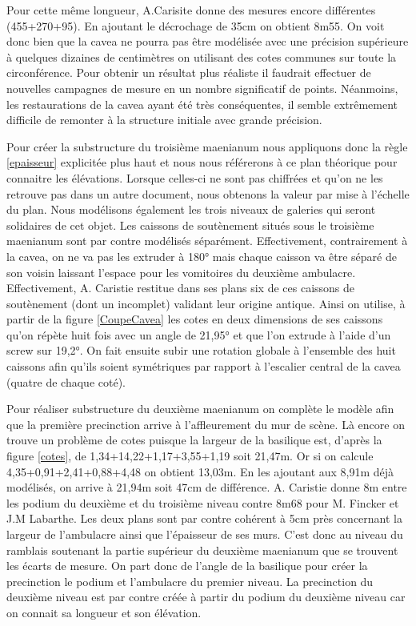 Pour cette même longueur, A.Carisite donne des mesures encore différentes (455+270+95). En ajoutant le décrochage de 35cm on obtient 8m55. On voit donc bien que la cavea ne pourra pas être modélisée avec une précision supérieure à quelques dizaines de centimètres on utilisant des cotes communes sur toute la circonférence. Pour obtenir un résultat plus réaliste il faudrait effectuer de nouvelles campagnes de mesure en un nombre significatif de points. Néanmoins, les restaurations de la cavea ayant été très conséquentes, il semble extrêmement difficile de remonter à la structure initiale avec grande précision.

Pour créer la substructure du troisième maenianum nous appliquons donc la règle \ref{epaisseur} explicitée plus haut et nous nous référerons à ce plan théorique pour connaitre les élévations. Lorsque celles-ci ne sont pas chiffrées et qu'on ne les retrouve pas dans un autre document, nous obtenons la valeur par mise à l'échelle du plan. Nous modélisons également les trois niveaux de galeries qui seront solidaires de cet objet. Les caissons de soutènement situés sous le troisième \gls{maenianum} sont par contre modélisés séparément. Effectivement, contrairement à la cavea, on ne va pas les extruder à 180° mais chaque caisson va être séparé de son voisin laissant l'espace pour les vomitoires du deuxième ambulacre. Effectivement, A. Caristie restitue dans ses plans six de ces caissons de soutènement (dont un incomplet) validant leur origine antique. Ainsi on utilise, à partir de la figure \ref{CoupeCavea} les cotes en deux dimensions de ses caissons qu'on répète huit fois avec un angle de 21,95° et que l'on extrude à l'aide d'un \gls{screw} sur 19,2°. On fait ensuite subir une rotation globale à l'ensemble des huit caissons afin qu'ils soient symétriques par rapport à l'escalier central de la cavea (quatre de chaque coté). 

Pour réaliser substructure du deuxième maenianum on complète le modèle afin que la première precinction arrive à l'affleurement du mur de scène. Là encore on trouve un problème de cotes puisque la largeur de la basilique est, d'après la figure \ref{cotes}, de 1,34+14,22+1,17+3,55+1,19 soit 21,47m. Or si on calcule 4,35+0,91+2,41+0,88+4,48 on obtient 13,03m. En les ajoutant aux 8,91m déjà modélisés, on arrive à 21,94m soit 47cm de différence. A. Caristie donne 8m entre les podium du deuxième et du troisième niveau contre 8m68 pour M. Fincker et J.M Labarthe. Les deux plans sont par contre cohérent à 5cm près concernant la largeur de l'ambulacre ainsi que l'épaisseur de ses murs. C'est donc au niveau du ramblais soutenant la partie supérieur du deuxième maenianum que se trouvent les écarts de mesure. On part donc de l'angle de la basilique pour créer la precinction le podium et l'ambulacre du premier niveau. La precinction du deuxième niveau est par contre créée à partir du podium du deuxième niveau car on connait sa longueur et son élévation. 

